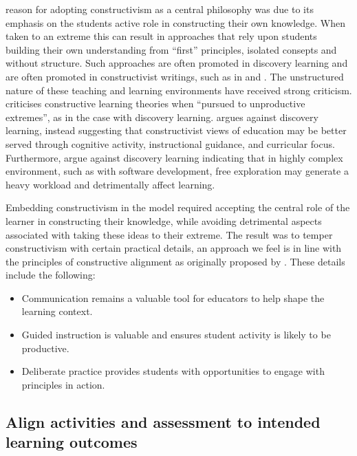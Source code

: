 \citet{Biggs:1996c} reason for adopting constructivism as a central philosophy was due to its emphasis on the students active role in constructing their own knowledge. When taken to an extreme this can result in approaches that rely upon students building their own understanding from ``first'' principles, isolated consepts and without structure. Such approaches are often promoted in discovery learning \cite{Bruner:1961} and are often promoted in constructivist writings, such as in \citet{Glasersfeld:1989} and \citet{Duffy:1996}. The unstructured nature of these teaching and learning environments have received strong criticism. \citet{Anderson:1998} criticises constructive learning theories when ``pursued to unproductive extremes'', as in the case with discovery learning. \citet{Mayer:2004} argues against discovery learning, instead suggesting that constructivist views of education may be better served through cognitive activity, instructional guidance, and curricular focus. Furthermore, \citet{Kirschner:2006} argue against discovery learning indicating that in highly complex environment, such as with software development, free exploration may generate a heavy workload and detrimentally affect learning. 

Embedding constructivism in the model required accepting the central role of the learner in constructing their knowledge, while avoiding detrimental aspects associated with taking these ideas to their extreme. The result was to temper constructivism with certain practical details, an approach we feel is in line with the principles of constructive alignment as originally proposed by \citet{Biggs:1996c}. These details include the following:

\begin{itemize}[noitemsep,nolistsep]
	\item Communication remains a valuable tool for educators to help shape the learning context.
	\item Guided instruction is valuable and ensures student activity is likely to be productive.
	\item Deliberate practice provides students with opportunities to engage with principles in action.
\end{itemize}


\subsection{Align activities and assessment to intended learning outcomes} %
\label{ssub:align_activities_and_assessment_to_intended_learning_outcomes_}

